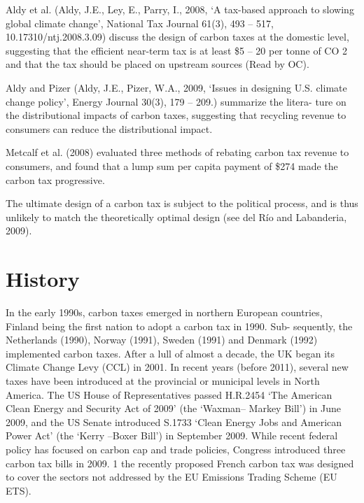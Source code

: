 \documentclass[version=3.21, pagesize, twoside=off, bibliography=totoc, DIV=calc, fontsize=12pt, a4paper, french, english]{scrartcl}
\begin{document}
Aldy et al. (Aldy, J.E., Ley, E., Parry, I., 2008, ‘A tax-based approach to slowing global climate change’, National Tax Journal 61(3),
493 – 517, 10.17310/ntj.2008.3.09) discuss the design of carbon taxes
at the domestic level, suggesting that the efficient near-term tax is at least \$5 – 20 per tonne of CO 2 and
that the tax should be placed on upstream sources (Read by OC).
 
Aldy and Pizer (Aldy, J.E., Pizer, W.A., 2009, ‘Issues in designing U.S. climate change policy’, Energy Journal 30(3), 179 – 209.) summarize the litera-
ture on the distributional impacts of carbon taxes, suggesting that recycling revenue to consumers can
reduce the distributional impact.

Metcalf et al. (2008) evaluated three methods of rebating
carbon tax revenue to consumers, and found that a lump sum per capita payment of \$274 made the
carbon tax progressive.

The ultimate design of a carbon tax is subject to the political process, and is thus unlikely to match the theoretically optimal design (see del Río and Labanderia, 2009).

\section{History}
In the early 1990s, carbon taxes emerged
in northern European countries, Finland being the first nation to adopt a carbon tax in 1990. Sub-
sequently, the Netherlands (1990), Norway (1991), Sweden (1991) and Denmark (1992) implemented
carbon taxes. After a lull of almost a decade, the UK began its Climate Change Levy (CCL) in 2001. In
recent years (before 2011), several new taxes have been introduced at the provincial or municipal levels in North
America.
The US House of Representatives
passed H.R.2454 ‘The American Clean Energy and Security Act of 2009’ (the ‘Waxman– Markey Bill’) in
June 2009, and the US Senate introduced S.1733 ‘Clean Energy Jobs and American Power Act’ (the
‘Kerry –Boxer Bill’) in September 2009. While recent federal policy has focused on carbon cap and
trade policies, Congress introduced three carbon tax bills in 2009. 1
the recently proposed French carbon tax was
designed to cover the sectors not addressed by the EU Emissions Trading Scheme (EU ETS).
\end{document}
